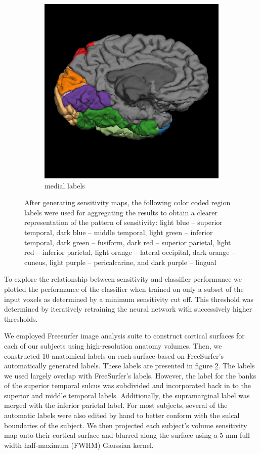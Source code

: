 \documentclass[preprint,5p,authoryear]{elsarticle}
\begin{document}
\begin{figure}
\begin{subfigure}{0.3\textwidth}
\includegraphics[width=\textwidth]{figures/lh-medial-labels}
\caption{medial labels}
\label{fig:medial-labels}
\end{subfigure}
\caption{After generating sensitivity maps, the following color coded region labels were used for aggregating the results to obtain a clearer representation of the pattern of sensitivity: light blue -- superior temporal, dark blue -- middle temporal, light green -- inferior temporal, dark green -- fusiform, dark red -- superior parietal, light red -- inferior parietal, light orange -- lateral occipital, dark orange -- cuneus, light purple -- pericalcarine, and dark purple -- lingual}
\label{fig:labels}
\end{figure}

To  explore the relationship between sensitivity and classifier performance we plotted the performance of the classifier when trained on only a subset of the input voxels as determined by a minimum sensitivity cut off.
This threshold was determined by iteratively retraining the neural network with successively higher thresholds.

We employed Freesurfer image analysis suite to construct cortical surfaces for each of our subjects using high-resolution anatomy volumes.
Then, we constructed 10 anatomical labels on each surface based on FreeSurfer's automatically generated labels.
These labels are presented in figure \ref{fig:labels}.
The labels we used largely overlap with FreeSurfer's labels.
However, the label for the banks of the superior temporal sulcus was subdivided and incorporated back in to the superior and middle temporal labels.
Additionally, the supramarginal label was merged with the inferior parietal label.
For most subjects, several of the automatic labels were also edited by hand to better conform with the sulcal boundaries of the subject.
We then projected each subject's volume sensitivity map onto their cortical surface and blurred along the surface using a 5 mm full-width half-maximum (FWHM) Gaussian kernel.
\end{document}
